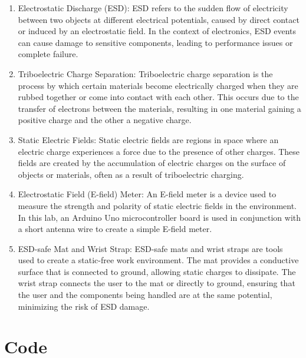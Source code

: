 \documentclass[a4paper,11pt]{article}%
\begin{document}
\begin{enumerate}
  \item Electrostatic Discharge (ESD): ESD refers to the sudden flow of electricity between two objects at different electrical potentials, caused by direct contact or induced by an electrostatic field. In the context of electronics, ESD events can cause damage to sensitive components, leading to performance issues or complete failure.
  \item Triboelectric Charge Separation: Triboelectric charge separation is the process by which certain materials become electrically charged when they are rubbed together or come into contact with each other. This occurs due to the transfer of electrons between the materials, resulting in one material gaining a positive charge and the other a negative charge.
  \item Static Electric Fields: Static electric fields are regions in space where an electric charge experiences a force due to the presence of other charges. These fields are created by the accumulation of electric charges on the surface of objects or materials, often as a result of triboelectric charging.
  \item Electrostatic Field (E-field) Meter: An E-field meter is a device used to measure the strength and polarity of static electric fields in the environment. In this lab, an Arduino Uno microcontroller board is used in conjunction with a short antenna wire to create a simple E-field meter.
  \item ESD-safe Mat and Wrist Strap: ESD-safe mats and wrist straps are tools used to create a static-free work environment. The mat provides a conductive surface that is connected to ground, allowing static charges to dissipate. The wrist strap connects the user to the mat or directly to ground, ensuring that the user and the components being handled are at the same potential, minimizing the risk of ESD damage.
\end{enumerate}


\section{Code}
\end{document}
